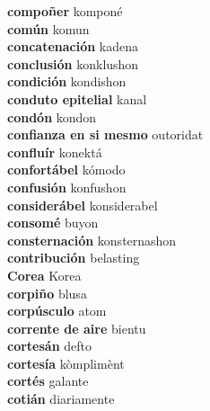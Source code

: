 \textbf{ compoñer  } komponé \\
\textbf{ común  } komun \\
\textbf{ concatenación  } kadena \\
\textbf{ conclusión  } konklushon \\
\textbf{ condición  } kondishon \\
\textbf{ conduto epitelial  } kanal \\
\textbf{ condón  } kondon \\
\textbf{ confianza en si mesmo  } outoridat \\
\textbf{ confluír  } konektá \\
\textbf{ confortábel  } kómodo \\
\textbf{ confusión  } konfushon \\
\textbf{ considerábel  } konsiderabel \\
\textbf{ consomé  } buyon \\
\textbf{ consternación  } konsternashon \\
\textbf{ contribución  } belasting \\
\textbf{ Corea  } Korea \\
\textbf{ corpiño  } blusa \\
\textbf{ corpúsculo  } atom \\
\textbf{ corrente de aire  } bientu \\
\textbf{ cortesán  } defto \\
\textbf{ cortesía  } kòmplimènt \\
\textbf{ cortés  } galante \\
\textbf{ cotián  } diariamente \\
